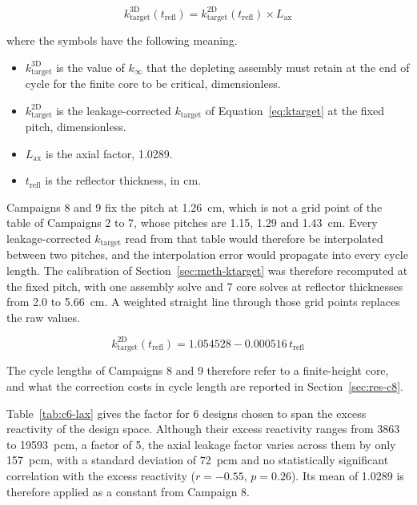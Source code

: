 \begin{equation}
k_\mathrm{target}^\mathrm{3D}(t_\mathrm{refl}) = k_\mathrm{target}^\mathrm{2D}(t_\mathrm{refl}) \times L_\mathrm{ax}
\label{eq:ktarget-3d}
\end{equation}

\noindent where the symbols have the following meaning.

\begin{itemize}
  \item $k_\mathrm{target}^\mathrm{3D}$ is the value of $k_\infty$ that the depleting
        assembly must retain at the end of cycle for the finite core to be
        critical, dimensionless.

  \item $k_\mathrm{target}^\mathrm{2D}$ is the leakage-corrected $k_\mathrm{target}$ of
        Equation~\eqref{eq:ktarget} at the fixed pitch, dimensionless.

  \item $L_\mathrm{ax}$ is the axial factor, \num{1.0289}.

  \item $t_\mathrm{refl}$ is the reflector thickness, in cm.
\end{itemize}

Campaigns 8 and 9 fix the pitch at \SI{1.26}{cm}, which is not a grid
point of the table of Campaigns 2 to 7, whose pitches are 1.15, 1.29
and \SI{1.43}{cm}. Every leakage-corrected $k_\mathrm{target}$ read from
that table would therefore be interpolated between two pitches, and the
interpolation error would propagate into every cycle length. The
calibration of Section~\ref{sec:meth-ktarget} was therefore recomputed
at the fixed pitch, with one assembly solve and 7 core solves at
reflector thicknesses from 2.0 to \SI{5.66}{cm}. A weighted straight line
through those grid points replaces the raw values.

\begin{equation}
k_\mathrm{target}^\mathrm{2D}(t_\mathrm{refl}) = 1.054528 - 0.000516\, t_\mathrm{refl}
\label{eq:ktarget-c8-fit}
\end{equation}

The cycle lengths of Campaigns 8 and 9 therefore refer to a
finite-height core, and what the correction costs in cycle length are
reported in Section~\ref{sec:res-c8}.

\label{sec:res-c6-lax}

Table~\ref{tab:c6-lax} gives the factor for 6 designs chosen to span
the excess reactivity of the design space. Although their excess
reactivity ranges from \num{3863} to \SI{19593}{pcm}, a factor of 5, the axial leakage factor varies across them by only
\SI{157}{pcm}, with a standard deviation of \SI{72}{pcm} and no statistically significant correlation with the excess reactivity ($r = -0.55$, $p = 0.26$).
Its mean of \num{1.0289} is therefore applied as a constant from
Campaign 8.


